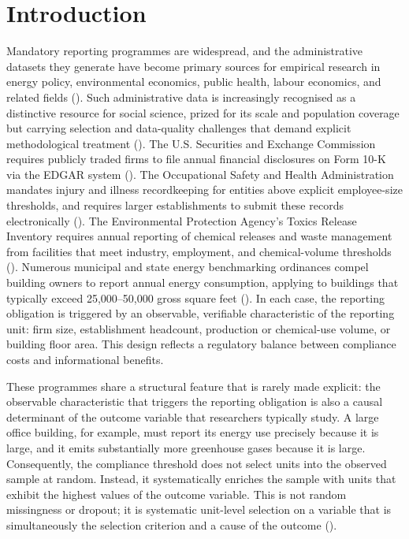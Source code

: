 \section{Introduction}
Mandatory reporting programmes are widespread, and the administrative datasets they generate have become primary sources for empirical research in energy policy, environmental economics, public health, labour economics, and related fields (). Such administrative data is increasingly recognised as a distinctive resource for social science, prized for its scale and population coverage but carrying selection and data-quality challenges that demand explicit methodological treatment (). The U.S. Securities and Exchange Commission requires publicly traded firms to file annual financial disclosures on Form 10-K via the EDGAR system (). The Occupational Safety and Health Administration mandates injury and illness recordkeeping for entities above explicit employee-size thresholds, and requires larger establishments to submit these records electronically (). The Environmental Protection Agency's Toxics Release Inventory requires annual reporting of chemical releases and waste management from facilities that meet industry, employment, and chemical-volume thresholds (). Numerous municipal and state energy benchmarking ordinances compel building owners to report annual energy consumption, applying to buildings that typically exceed 25,000--50,000 gross square feet (). In each case, the reporting obligation is triggered by an observable, verifiable characteristic of the reporting unit: firm size, establishment headcount, production or chemical-use volume, or building floor area. This design reflects a regulatory balance between compliance costs and informational benefits.

These programmes share a structural feature that is rarely made explicit: the observable characteristic that triggers the reporting obligation is also a causal determinant of the outcome variable that researchers typically study. A large office building, for example, must report its energy use precisely because it is large, and it emits substantially more greenhouse gases because it is large. Consequently, the compliance threshold does not select units into the observed sample at random. Instead, it systematically enriches the sample with units that exhibit the highest values of the outcome variable. This is not random missingness or dropout; it is systematic unit-level selection on a variable that is simultaneously the selection criterion and a cause of the outcome ().

